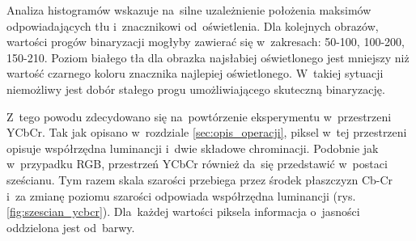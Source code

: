 Analiza histogramów wskazuje na~silne uzależnienie położenia maksimów odpowiadających tłu i~znacznikowi od~oświetlenia.  
Dla kolejnych obrazów, wartości progów binaryzacji mogłyby zawierać się w~zakresach: 50-100, 100-200, 150-210. Poziom białego tła dla obrazka najsłabiej oświetlonego jest mniejszy niż wartość czarnego koloru znacznika najlepiej oświetlonego. 
W~takiej sytuacji niemożliwy jest dobór stałego progu umożliwiającego skuteczną binaryzację.

Z~tego powodu zdecydowano się na~powtórzenie eksperymentu w~przestrzeni YCbCr. 
Tak jak opisano w~rozdziale \ref{sec:opis_operacji}, piksel w~tej przestrzeni opisuje współrzędna luminancji i~dwie składowe chrominacji. 
Podobnie jak w~przypadku RGB, przestrzeń YCbCr również da~się przedstawić w~postaci sześcianu. 
Tym razem skala szarości przebiega przez środek płaszczyzn Cb-Cr i~za zmianę poziomu szarości odpowiada współrzędna luminancji (rys. \ref{fig:szescian_ycbcr}). 
Dla~każdej wartości piksela informacja o~jasności oddzielona jest od~barwy.

